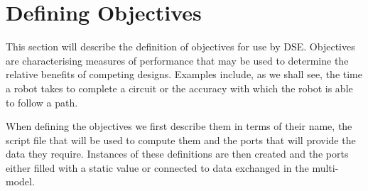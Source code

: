 \documentclass[11pt,a4paper]{../tutorial}
\begin{document}
\newpage
\section{Defining Objectives}
\label{sec:obj_def}

This section will describe the definition of objectives for use by DSE.  Objectives are characterising measures of performance that may be used to determine the relative benefits of competing designs.  Examples include, as we shall see, the time a robot takes to complete a circuit or the accuracy with which the robot is able to follow a path.

When defining the objectives we first describe them in terms of their name, the script file that will be used to compute them and the ports that will provide the data they require.  Instances of these definitions are then created and the ports either filled with a static value or connected to data exchanged in the multi-model.
\end{document}
